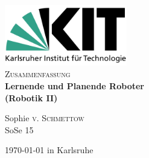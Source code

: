\documentclass[11pt]{scrartcl}
\begin{document}
\begin{titlepage}

\begin{center}


\includegraphics[width=0.4\textwidth]{Logo_KIT.png}\\[1cm]    



\textsc{\Large Zusammenfassung}\\[0.5cm]


{ \huge \bfseries Lernende und Planende Roboter}\\[0.4cm]
{ \large \bfseries (Robotik II)}
\bigskip


Sophie \textsc{v. Schmettow}\\
SoSe 15\\



\vfill

{\large \today{} in Karlsruhe} 

\end{center}


\end{titlepage}


\tableofcontents
\newpage


\end{document}

